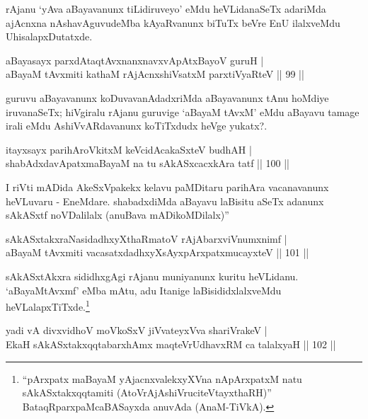\begin{artha}
rAjanu `yAva aBayavanunx tiLidiruveyo' eMdu heVLidanaSeTx adariMda ajAcnxna nAshavAguvudeMba kAyaRvanunx biTuTx beVre EnU ilalxveMdu UhisalapxDutatxde.
\end{artha}


\begin{shl}
aBayasayx parxdAtaqtAvxnanxnavxvApAtxBayoV guruH |\\
aBayaM tAvxmiti kathaM rAjAcnx\s \s shiVsatxM parxtiVyaRteV \hfill || 99 || 
\end{shl}

\begin{artha}
guruvu aBayavanunx koDuvavanAdadxriMda aBayavanunx tAnu hoMdiye iruvanaSeTx; hiVgiralu rAjanu guruvige `aBayaM tAvxM' eMdu aBayavu tamage irali eMdu AshiVvARdavanunx koTiTxdudx heVge yukatx?.
\end{artha}


\begin{shl}
itayxsayx parihAroVkitxM keVcidAcakaSxteV budhAH |\\
shabAdxdavApatxmaBayaM na tu sAkASxcacxkAra tatf \hfill || 100 || 
\end{shl}

\begin{artha}
I riVti mADida AkeSxVpakekx kelavu paMDitaru parihAra vacanavanunx heVLuvaru - EneMdare. shabadxdiMda aBayavu laBisitu aSeTx adanunx sAkASxtf noVDalilalx (anuBava mADikoMDilalx)''
\end{artha}

\begin{shl}
sAkASxtakxraNasidadhxyXthaRmatoV rAjA\s barxviVnumxnimf |\\
aBayaM tAvxmiti vacasatxdadhxyXsAyxpArxpatxmucayxteV \hfill || 101 || 
\end{shl}

\begin{artha}
sAkASxtAkxra sididhxgAgi rAjanu muniyanunx kuritu heVLidanu. `aBayaMtAvxmf' eMba mAtu, adu Itanige laBisididxlalxveMdu heVLalapxTiTxde.\footnote{``pArxpatx maBayaM yAjacnxvalekxyXVna nApArxpatxM natu sAkASxtakxqqtamiti (AtoVrAjAshiVruciteVtayxthaRH)'' BataqRparxpaMcaBASayxda anuvAda (AnaM-TiVkA).}
\end{artha}


\begin{shl}
yadi vA divxvidhoV moVkoSxV jiVvateyxVva shariVrakeV |\\
EkaH sAkASxtakxqqtabarxhAmx maqteVrUdhavxRM ca talalxyaH \hfill || 102 || 
\end{shl}

